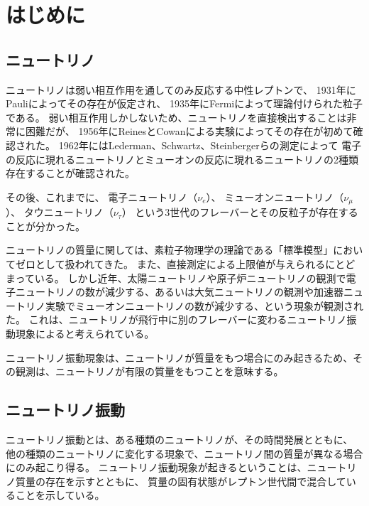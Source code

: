 \chapter{はじめに}

\section{ニュートリノ}

ニュートリノは弱い相互作用を通してのみ反応する中性レプトンで、
1931年にPauliによってその存在が仮定され、
1935年にFermiによって理論付けられた粒子である。
弱い相互作用しかしないため、ニュートリノを直接検出することは非常に困難だが、
1956年にReinesとCowanによる実験によってその存在が初めて確認された。
1962年にはLederman、Schwartz、Steinbergerらの測定によって
電子の反応に現れるニュートリノとミューオンの反応に現れるニュートリノの2種類存在することが確認された。

その後、これまでに、
電子ニュートリノ（$\nu_{e}$）、
ミューオンニュートリノ（$\nu_{\mu}$）、
タウニュートリノ（$\nu_{\tau}$）
という3世代のフレーバーとその反粒子が存在することが分かった。

ニュートリノの質量に関しては、素粒子物理学の理論である「標準模型」においてゼロとして扱われてきた。
また、直接測定による上限値が与えられるにとどまっている。
しかし近年、太陽ニュートリノや原子炉ニュートリノの観測で電子ニュートリノの数が減少する、あるいは大気ニュートリノの観測や加速器ニュートリノ実験でミューオンニュートリノの数が減少する、という現象が観測された。
これは、ニュートリノが飛行中に別のフレーバーに変わるニュートリノ振動現象によると考えられている。

ニュートリノ振動現象は、ニュートリノが質量をもつ場合にのみ起きるため、その観測は、ニュートリノが有限の質量をもつことを意味する。


\section{ニュートリノ振動}

ニュートリノ振動とは、ある種類のニュートリノが、その時間発展とともに、
他の種類のニュートリノに変化する現象で、ニュートリノ間の質量が異なる場合にのみ起こり得る。
ニュートリノ振動現象が起きるということは、ニュートリノ質量の存在を示すとともに、
質量の固有状態がレプトン世代間で混合していることを示している。

